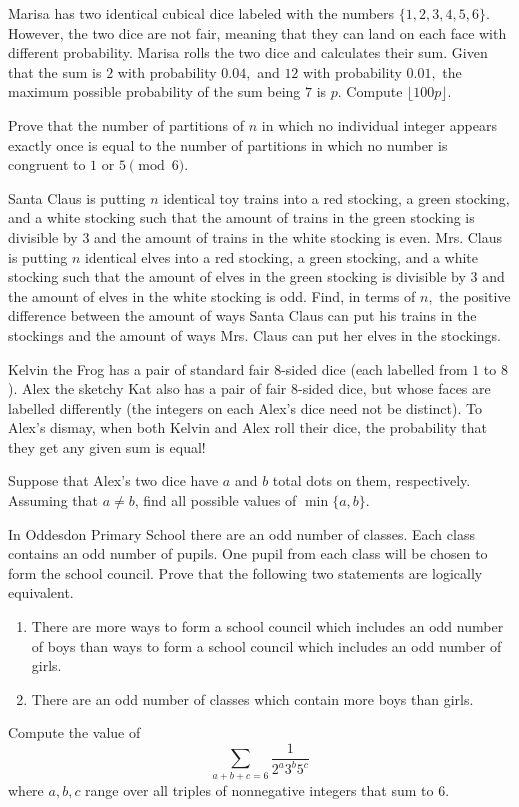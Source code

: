 \documentclass{article}
\begin{document}
\begin{prob}{4}
Marisa has two identical cubical dice labeled with the numbers $\{1,2,3,4,5,6\}.$ However, the two dice are not fair, meaning that they can land on each face with different probability. Marisa rolls the two dice and calculates their sum. Given that the sum is $2$ with probability $0.04,$ and $12$ with probability $0.01,$ the maximum possible probability of the sum being $7$ is $p.$ Compute $\lfloor 100p\rfloor.$
\end{prob}

\begin{req}[]{6}
Prove that the number of partitions of $n$ in which no individual integer appears exactly once is equal to the number of partitions in which no number is congruent to $1$ or $5\pmod{6}.$
\end{req}
    
\begin{prob}[ART 2020/4]{6}
Santa Claus is putting $n$ identical toy trains into a red stocking, a green stocking, and a white stocking such that the amount of trains in the green stocking is divisible by $3$ and the amount of trains in the white stocking is even. Mrs. Claus is putting $n$ identical elves into a red stocking, a green stocking, and a white stocking such that the amount of elves in the green stocking is divisible by $3$ and the amount of elves in the white stocking is odd. Find, in terms of $n,$ the positive difference between the amount of ways Santa Claus can put his trains in the stockings and the amount of ways Mrs. Claus can put her elves in the stockings.
\end{prob}
    
\begin{prob}[HMMT 2016]{9}
Kelvin the Frog has a pair of standard fair $8$-sided dice (each labelled from $1$ to $8$). Alex the sketchy Kat also has a pair of fair $8$-sided dice, but whose faces are labelled differently (the integers on each Alex's dice need not be distinct). To Alex's dismay, when both Kelvin and Alex roll their dice, the probability that they get any given sum is equal!

Suppose that Alex's two dice have $a$ and $b$ total dots on them, respectively. Assuming that $a \neq b$, find all possible values of $\min \{a,b\}$.
\end{prob}

\begin{req}{9}
In Oddesdon Primary School there are an odd number of classes. Each class contains an odd number of pupils. One pupil from each class will be chosen to form the school council. Prove that the following two statements are logically equivalent.
\begin{enumerate}
\item There are more ways to form a school council which includes an odd number of boys than ways to form a school council which includes an odd number of girls.

\item There are an odd number of classes which contain more boys than girls.
\end{enumerate}
\end{req}

\begin{prob}[NYCMT 2020]{13}
Compute the value of
\[\sum_{a+b+c=6}\frac{1}{2^a3^b5^c}\]
where $a,b,c$ range over all triples of nonnegative integers that sum to $6.$
\end{prob}
\end{document}
